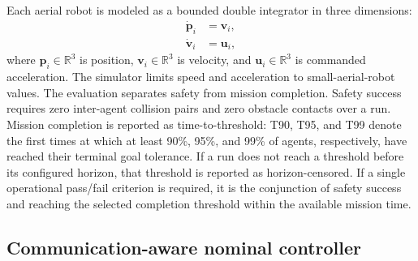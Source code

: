\documentclass[11pt]{article}
\begin{document}
Each aerial robot is modeled as a bounded double integrator in three dimensions:
\begin{align}
    \dot{\mathbf{p}}_i &= \mathbf{v}_i,\\
    \dot{\mathbf{v}}_i &= \mathbf{u}_i,
\end{align}
where $\mathbf{p}_i \in \mathbb{R}^3$ is position, $\mathbf{v}_i \in \mathbb{R}^3$ is velocity, and $\mathbf{u}_i \in \mathbb{R}^3$ is commanded acceleration. The simulator limits speed and acceleration to small-aerial-robot values. The evaluation separates safety from mission completion. Safety success requires zero inter-agent collision pairs and zero obstacle contacts over a run. Mission completion is reported as time-to-threshold: T90, T95, and T99 denote the first times at which at least 90\%, 95\%, and 99\% of agents, respectively, have reached their terminal goal tolerance. If a run does not reach a threshold before its configured horizon, that threshold is reported as horizon-censored. If a single operational pass/fail criterion is required, it is the conjunction of safety success and reaching the selected completion threshold within the available mission time.

\subsection{Communication-aware nominal controller}
\end{document}
